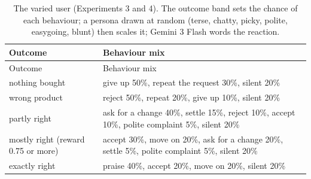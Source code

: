 \begin{longtable}[]{@{}
  >{\raggedright\arraybackslash}p{}
  >{\raggedright\arraybackslash}p{}@{}}
\caption{The varied user (Experiments 3 and 4). The outcome band sets the chance of each behaviour; a persona drawn at random (terse, chatty, picky, polite, easygoing, blunt) then scales it; Gemini 3 Flash words the reaction.}\label{tab:A2}\tabularnewline
\toprule\noalign{}
\begin{minipage}[b]{\linewidth}\raggedright
Outcome
\end{minipage} & \begin{minipage}[b]{\linewidth}\raggedright
Behaviour mix
\end{minipage} \\
\midrule\noalign{}
\endfirsthead
\toprule\noalign{}
\begin{minipage}[b]{\linewidth}\raggedright
Outcome
\end{minipage} & \begin{minipage}[b]{\linewidth}\raggedright
Behaviour mix
\end{minipage} \\
\midrule\noalign{}
\endhead
\bottomrule\noalign{}
\endlastfoot
nothing bought & give up 50\%, repeat the request 30\%, silent 20\% \\
wrong product & reject 50\%, repeat 20\%, give up 10\%, silent 20\% \\
partly right & ask for a change 40\%, settle 15\%, reject 10\%, accept 10\%, polite complaint 5\%, silent 20\% \\
mostly right (reward 0.75 or more) & accept 30\%, move on 20\%, ask for a change 20\%, settle 5\%, polite complaint 5\%, silent 20\% \\
exactly right & praise 40\%, accept 20\%, move on 20\%, silent 20\% \\
\end{longtable}

